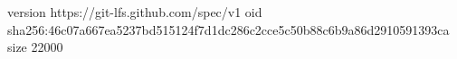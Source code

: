 version https://git-lfs.github.com/spec/v1
oid sha256:46c07a667ea5237bd515124f7d1dc286c2cce5c50b88c6b9a86d2910591393ca
size 22000
